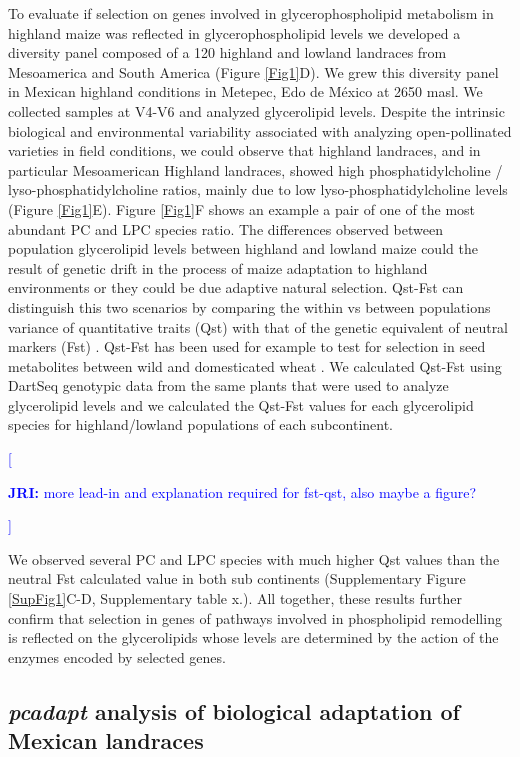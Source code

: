 \documentclass[9pt,twocolumn,twoside,lineno]{gsajnl}
\newcommand{\jri}[1]{\textcolor{blue}{[\begin{tiny}\textbf{JRI:} {#1}\end{tiny}]}}
\begin{document}
To evaluate if selection on genes involved in glycerophospholipid metabolism in highland maize was reflected in glycerophospholipid levels we developed a diversity panel composed of a 120 highland and lowland landraces from Mesoamerica and South America (Figure \ref{Fig1}D). 
We grew this diversity panel in Mexican highland conditions in Metepec, Edo de México at 2650 masl. We collected samples at V4-V6 and analyzed glycerolipid levels. 
Despite the intrinsic biological and environmental variability associated with analyzing open-pollinated varieties in field conditions, we could observe that highland landraces, and in particular Mesoamerican Highland landraces, showed  high phosphatidylcholine / lyso-phosphatidylcholine ratios, mainly due to low lyso-phosphatidylcholine levels (Figure \ref{Fig1}E). 
Figure \ref{Fig1}F shows an example a pair of one of the most abundant PC and LPC species ratio. 
The differences observed between population glycerolipid levels between highland and lowland maize could the result of genetic drift in the process of maize adaptation to highland environments or they could be due adaptive natural selection. Qst-Fst can distinguish this two scenarios by comparing the within vs between populations variance of quantitative traits (Qst) with that of the genetic equivalent of neutral markers (Fst) \cite{Leinonen2013-ic}. Qst-Fst has been used for example to test for selection in seed metabolites between wild and domesticated wheat \cite{Beleggia2016-xw}.
We calculated Qst-Fst using DartSeq genotypic data from the same plants that were used to analyze glycerolipid levels and we calculated the Qst-Fst values for each glycerolipid species for highland/lowland populations of each subcontinent.
\jri{more lead-in and explanation required for  fst-qst, also maybe a figure?}
We observed several PC and LPC species with much higher Qst values than the neutral Fst calculated value in both sub continents (Supplementary Figure \ref{SupFig1}C-D, Supplementary table x.). 
All together, these results further confirm that selection in genes of pathways involved in phospholipid remodelling is reflected on the glycerolipids whose levels are determined by the action of the enzymes encoded by selected genes.   

\subsection{\textit{pcadapt} analysis of biological adaptation of Mexican landraces} 
\end{document}
